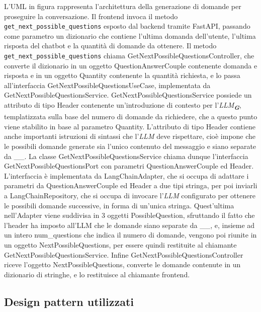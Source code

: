 L'UML in figura rappresenta l'architettura della generazione di domande per proseguire la conversazione.
Il frontend invoca il metodo \texttt{get\_next\_possible\_questions} esposto dal backend tramite FastAPI, passando come parametro un dizionario che contiene l'ultima domanda dell'utente, l'ultima risposta del chatbot e la quantità di domande da ottenere.
Il metodo \texttt{get\_next\_possible\_questions} chiama GetNextPossibleQuestionsController, che converte il dizionario in un oggetto QuestionAnswerCouple contenente domanda e risposta e in un oggetto Quantity contenente la quantità richiesta, e lo passa all'interfaccia GetNextPossibleQuestionsUseCase, implementata da GetNextPossibleQuestionsService.
GetNextPossibleQuestionsService possiede un attributo di tipo Header contenente un'introduzione di contesto per l'\emph{LLM}\textsubscript{\textbf{\textit{G}}}, templatizzata sulla base del numero di domande da richiedere, che a questo punto viene stabilito in base al parametro Quantity. L'attributo di tipo Header contiene anche importanti istruzioni di sintassi che l'\emph{LLM} deve rispettare, cioè impone che le possibili domande generate sia l'unico contenuto del messaggio e siano separate da \_\_. La classe GetNextPossibleQuestionsService chiama dunque l'interfaccia GetNextPossibleQuestionsPort con parametri QuestionAnswerCouple ed Header.
L'interfaccia è implementata da LangChainAdapter, che si occupa di adattare i parametri da QuestionAnswerCouple ed Header a due tipi stringa, per poi inviarli a LangChainRepository, che si occupa di invocare l'\emph{LLM} configurato per ottenere le possibili domande successive, in forma di un'unica stringa. Quest'ultima nell'Adapter viene suddivisa in 3 oggetti PossibleQuestion, sfruttando il fatto che l'header ha imposto all'LLM che le domande siano separate da \_\_, e, insieme ad un intero num\_questions che indica il numero di domande, vengono poi riunite in un oggetto NextPossibleQuestions, per essere quindi restituite al chiamante GetNextPossibleQuestionsService.
Infine GetNextPossibleQuestionsController riceve l'oggetto NextPossibleQuestions, converte le domande contenute in un dizionario di stringhe, e lo restituisce al chiamante frontend.

\newpage



\subsection{Design pattern utilizzati}
\label{sec:design_pattern_utilizzati}


